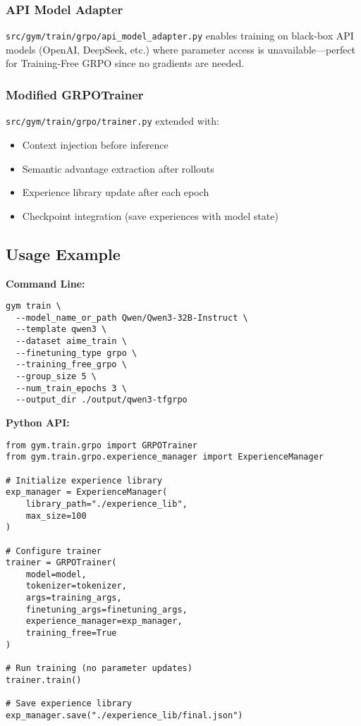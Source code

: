 \documentclass[11pt,a4paper]{article}
\begin{document}
\subsubsection{API Model Adapter}
\texttt{src/gym/train/grpo/api\_model\_adapter.py} enables training on black-box API models (OpenAI, DeepSeek, etc.) where parameter access is unavailable—perfect for Training-Free GRPO since no gradients are needed.

\subsubsection{Modified GRPOTrainer}
\texttt{src/gym/train/grpo/trainer.py} extended with:
\begin{itemize}
    \item Context injection before inference
    \item Semantic advantage extraction after rollouts
    \item Experience library update after each epoch
    \item Checkpoint integration (save experiences with model state)
\end{itemize}

\subsection{Usage Example}

\textbf{Command Line:}
\begin{verbatim}
gym train \
  --model_name_or_path Qwen/Qwen3-32B-Instruct \
  --template qwen3 \
  --dataset aime_train \
  --finetuning_type grpo \
  --training_free_grpo \
  --group_size 5 \
  --num_train_epochs 3 \
  --output_dir ./output/qwen3-tfgrpo
\end{verbatim}

\textbf{Python API:}
\begin{verbatim}
from gym.train.grpo import GRPOTrainer
from gym.train.grpo.experience_manager import ExperienceManager

# Initialize experience library
exp_manager = ExperienceManager(
    library_path="./experience_lib",
    max_size=100
)

# Configure trainer
trainer = GRPOTrainer(
    model=model,
    tokenizer=tokenizer,
    args=training_args,
    finetuning_args=finetuning_args,
    experience_manager=exp_manager,
    training_free=True
)

# Run training (no parameter updates)
trainer.train()

# Save experience library
exp_manager.save("./experience_lib/final.json")
\end{verbatim}
\end{document}
